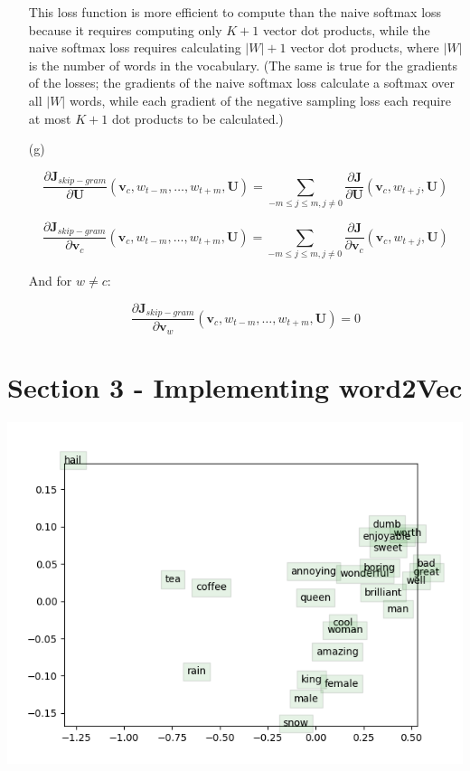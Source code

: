 \documentclass[12pt,letterpaper]{article}
\begin{document}
\begin{itemize}
    This loss function is more efficient to compute than the naive softmax loss because it requires computing only $K+1$ vector dot products, while the naive softmax loss requires calculating $\left|W\right| + 1$ vector dot products, where $\left|W\right|$ is the number of words in the vocabulary. (The same is true for the gradients of the losses; the gradients of the naive softmax loss calculate a softmax over all $\left|W\right|$ words, while each gradient of the negative sampling loss each require at most $K+1$ dot products to be calculated.)
    
    \item[(g)]
    
        $$\frac{\partial \mathbf{J}_{skip-gram}}{\partial \mathbf{U}}(\mathbf{v}_c, w_{t-m}, \ldots, w_{t+m}, \mathbf{U}) = \sum_{-m \leq j \leq m, j \neq 0}\frac{\partial \mathbf{J}}{\partial \mathbf{U}}(\mathbf{v}_c, w_{t+j}, \mathbf{U})$$
        
        $$\frac{\partial \mathbf{J}_{skip-gram}}{\partial \mathbf{v}_c}(\mathbf{v}_c, w_{t-m}, \ldots, w_{t+m}, \mathbf{U}) = \sum_{-m \leq j \leq m, j \neq 0}\frac{\partial \mathbf{J}}{\partial \mathbf{v}_c}(\mathbf{v}_c, w_{t+j}, \mathbf{U})$$
        
        And for $w \neq c$:
        
        $$\frac{\partial \mathbf{J}_{skip-gram}}{\partial \mathbf{v}_w}(\mathbf{v}_c, w_{t-m}, \ldots, w_{t+m}, \mathbf{U}) = 0$$
    
    
\end{itemize}

\section*{Section 3 - Implementing word2Vec}

\includegraphics{word_vectors.png}
\end{document}
